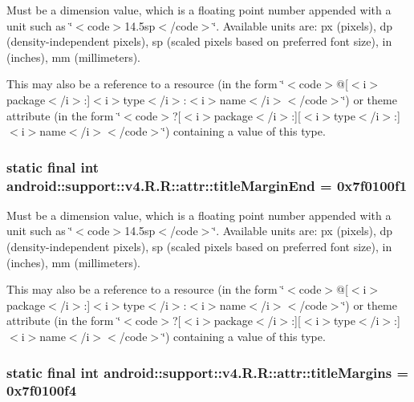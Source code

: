 Must be a dimension value, which is a floating point number appended with a unit such as \char`\"{}$<$code$>$14.5sp$<$/code$>$\char`\"{}. Available units are: px (pixels), dp (density-independent pixels), sp (scaled pixels based on preferred font size), in (inches), mm (millimeters). 

This may also be a reference to a resource (in the form \char`\"{}$<$code$>$@\mbox{[}$<$i$>$package$<$/i$>$:\mbox{]}$<$i$>$type$<$/i$>$:$<$i$>$name$<$/i$>$$<$/code$>$\char`\"{}) or theme attribute (in the form \char`\"{}$<$code$>$?\mbox{[}$<$i$>$package$<$/i$>$:\mbox{]}\mbox{[}$<$i$>$type$<$/i$>$:\mbox{]}$<$i$>$name$<$/i$>$$<$/code$>$\char`\"{}) containing a value of this type. \hypertarget{classandroid_1_1support_1_1v4_1_1_r_1_1attr_579b3a96bff28789353c5dac961fc466}{
\subsubsection[{titleMarginEnd}]{\setlength{\rightskip}{0pt plus 5cm}static final int android::support::v4.R.R::attr::titleMarginEnd = 0x7f0100f1}}
\label{classandroid_1_1support_1_1v4_1_1_r_1_1attr_579b3a96bff28789353c5dac961fc466}


Must be a dimension value, which is a floating point number appended with a unit such as \char`\"{}$<$code$>$14.5sp$<$/code$>$\char`\"{}. Available units are: px (pixels), dp (density-independent pixels), sp (scaled pixels based on preferred font size), in (inches), mm (millimeters). 

This may also be a reference to a resource (in the form \char`\"{}$<$code$>$@\mbox{[}$<$i$>$package$<$/i$>$:\mbox{]}$<$i$>$type$<$/i$>$:$<$i$>$name$<$/i$>$$<$/code$>$\char`\"{}) or theme attribute (in the form \char`\"{}$<$code$>$?\mbox{[}$<$i$>$package$<$/i$>$:\mbox{]}\mbox{[}$<$i$>$type$<$/i$>$:\mbox{]}$<$i$>$name$<$/i$>$$<$/code$>$\char`\"{}) containing a value of this type. \hypertarget{classandroid_1_1support_1_1v4_1_1_r_1_1attr_c0df1a123bc4809bee4ce3a5abc4b24d}{
\subsubsection[{titleMargins}]{\setlength{\rightskip}{0pt plus 5cm}static final int android::support::v4.R.R::attr::titleMargins = 0x7f0100f4}}
\label{classandroid_1_1support_1_1v4_1_1_r_1_1attr_c0df1a123bc4809bee4ce3a5abc4b24d}


